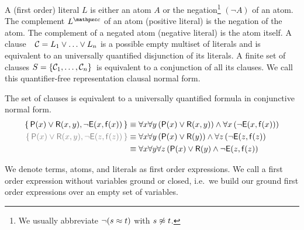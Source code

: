 
\begin{definition}[\CNF]\label{def:literals}\label{def:syntax:CNF}
A (first order) {\myem literal} $L$ is either an atom $A$ or the negation\footnote{
	We usually abbreviate $\lnot(s\approx t)$ with $s\not\approx t$.
} 
$(\lnot A)$ of an atom.
%
The {\myem complement} $L^\mcc$ of an atom (positive literal) is the negation of the atom.
The complement of a negated atom (negative literal) is the atom itself. 
%
A {\myem clause}\ \ ${\mathcal C} = L_1\lor\ldots\lor L_n$  is a possible empty multiset of literals 
and is equivalent to an universally quantified disjunction of its literals.
%
A finite {\myem set of clauses} $S=\{ {\mathcal C}_1,\ldots,{\mathcal C}_n \}$ is equivalent to a conjunction of all its clauses.
%
We call this quantifier-free representation {\myem clausal normal form}.
\end{definition}

\begin{example}The set of clauses is equivalent to a universally quantified formula in conjunctive normal form.
	\begin{align*}
		\{\, \mP(x)\lor\mR(x,y), \lnot \mE(x,\mf(x)) \, \}
		&\equiv
		\forall x \forall y\, (\mP(x)\lor\mR(x,y))
		\land
		\forall x\, (\lnot \mE(x,\mf(x))) 
		\\
		{\colG
			\{\, \mP(x)\lor\mR(x,y), \lnot \mE(z,\mf(z)) \, \}}
		&\equiv
		\forall x \forall y\, (\mP(x)\lor\mR(y))
		\land
		\forall z\,(\lnot \mE(z,\mf(z)) 
		\\
		&\equiv
		\forall x \forall y\forall z\, 
		(\mP(x)\lor\mR(y)\land \lnot \mE(z,\mf(z))
	\end{align*}
\end{example}

\begin{definition}
	We denote
	terms, atoms, and literals as first order expressions.
	We call a first order expression without variables {\myem ground} or {\myem closed}, 
	i.e.~we build our ground first order expressions over an empty set of variables.
\end{definition}

